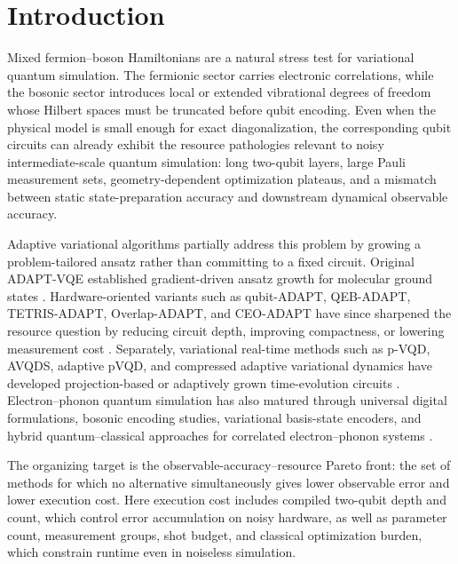 \documentclass[
  reprint,
  amsmath,
  amssymb,
  aps,
  pra,
  nofootinbib,
  superscriptaddress,
  floatfix
]{revtex4-2}
\begin{document}
\maketitle

\section{Introduction}

Mixed fermion--boson Hamiltonians are a natural stress test for variational quantum simulation. The fermionic sector carries electronic correlations, while the bosonic sector introduces local or extended vibrational degrees of freedom whose Hilbert spaces must be truncated before qubit encoding. Even when the physical model is small enough for exact diagonalization, the corresponding qubit circuits can already exhibit the resource pathologies relevant to noisy intermediate-scale quantum simulation: long two-qubit layers, large Pauli measurement sets, geometry-dependent optimization plateaus, and a mismatch between static state-preparation accuracy and downstream dynamical observable accuracy.

Adaptive variational algorithms partially address this problem by growing a problem-tailored ansatz rather than committing to a fixed circuit. Original ADAPT-VQE established gradient-driven ansatz growth for molecular ground states \cite{Grimsley2019}. Hardware-oriented variants such as qubit-ADAPT, QEB-ADAPT, TETRIS-ADAPT, Overlap-ADAPT, and CEO-ADAPT have since sharpened the resource question by reducing circuit depth, improving compactness, or lowering measurement cost \cite{Tang2021,Yordanov2021,Feniou2023,Anastasiou2024,Ramoa2025}. Separately, variational real-time methods such as p-VQD, AVQDS, adaptive pVQD, and compressed adaptive variational dynamics have developed projection-based or adaptively grown time-evolution circuits \cite{Barison2021,Yao2021,Linteau2024,Zhang2025}. Electron--phonon quantum simulation has also matured through universal digital formulations, bosonic encoding studies, variational basis-state encoders, and hybrid quantum--classical approaches for correlated electron--phonon systems \cite{Macridin2018,Sawaya2020,Li2023,Denner2023}.

The organizing target is the observable-accuracy--resource Pareto front: the set of methods for which no alternative simultaneously gives lower observable error and lower execution cost. Here execution cost includes compiled two-qubit depth and count, which control error accumulation on noisy hardware, as well as parameter count, measurement groups, shot budget, and classical optimization burden, which constrain runtime even in noiseless simulation.
\end{document}
